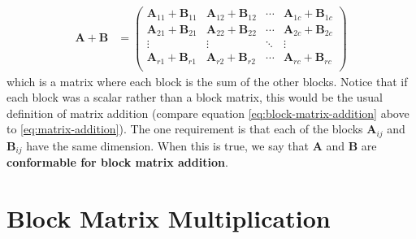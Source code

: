 \documentclass[
]{book}
\theoremstyle{definition}
\theoremstyle{definition}
\theoremstyle{definition}
\theoremstyle{remark}
\begin{document}
\[
\begin{aligned}
\mathbf{A} + \mathbf{B} & =
\begin{pmatrix} \mathbf{A}_{11} + \mathbf{B}_{11} & \mathbf{A}_{12} + \mathbf{B}_{12} & \cdots & \mathbf{A}_{1c} + \mathbf{B}_{1c}\\
\mathbf{A}_{21} + \mathbf{B}_{21} & \mathbf{A}_{22} + \mathbf{B}_{22} & \cdots & \mathbf{A}_{2c} + \mathbf{B}_{2c} \\
\vdots & \vdots & \ddots & \vdots \\
\mathbf{A}_{r1} + \mathbf{B}_{r1} & \mathbf{A}_{r2} + \mathbf{B}_{r2} & \cdots & \mathbf{A}_{rc} + \mathbf{B}_{rc} \\
\end{pmatrix}
\end{aligned}
\label{eq:block-matrix-addition}
\]
which is a matrix where each block is the sum of the other blocks. Notice that if each block was a scalar rather than a block matrix, this would be the usual definition of matrix addition (compare equation \eqref{eq:block-matrix-addition} above to \eqref{eq:matrix-addition}). The one requirement is that each of the blocks \(\mathbf{A}_{ij}\) and \(\mathbf{B}_{ij}\) have the same dimension. When this is true, we say that \(\mathbf{A}\) and \(\mathbf{B}\) are \textbf{conformable for block matrix addition}.

\hypertarget{block-matrix-multiplication}{%
\section{Block Matrix Multiplication}\label{block-matrix-multiplication}}
\end{document}
